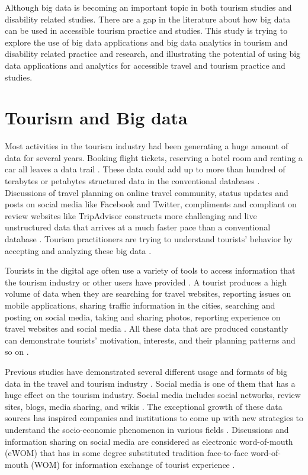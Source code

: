 Although big data is becoming an important topic in both tourism studies and disability
related studies. There are a gap in the literature about how big data can be used in 
accessible tourism practice and studies. This study is trying to explore the use of 
big data applications and big data analytics in tourism and disability related practice 
and research, and illustrating the potential of using big data applications and analytics 
for accessible travel and tourism practice and studies.

\section{Tourism and Big data}
Most activities in the tourism industry had been generating a huge amount of data for
several years. Booking flight tickets, reserving a hotel room and renting a car all
leaves a data trail \cite{Shafiee16}. These data could add up to more than hundred of
terabytes or petabytes structured data in the conventional databases \cite{akerkar2012}.
Discussions of travel planning on online travel community, status updates and posts on
social media like Facebook and Twitter, compliments and compliant on review websites like TripAdvisor
constructs more challenging and live unstructured data that arrives at a much
faster pace than a conventional database \cite{akerkar2012}. Tourism practitioners are
trying to understand tourists' behavior by accepting and analyzing these big data 
\cite{Shafiee16}.

Tourists in the digital age often use a variety of tools to access information that
the tourism industry or other users have provided \cite{XIANG2015120}. A tourist
produces a high volume of data when they are searching for travel websites, reporting
issues on mobile applications, sharing traffic information in the cities, searching and
posting on social media, taking and sharing photos, reporting experience on travel
websites and social media \cite{akerkar2012, Shafiee16}. All these data that are
produced constantly can demonstrate tourists' motivation, interests, and their
planning patterns and so on \cite{XIE2017101}.

Previous studies have demonstrated several different usage and formats of big data in
the travel and tourism industry \cite{XIE2017101}. Social media is one of them that
has a huge effect on the tourism industry. Social media includes social networks,
review sites, blogs, media sharing, and wikis \cite{XIANG2015120}. The exceptional
growth of these data sources has inspired companies and institutions to come up with 
new strategies to understand the socio-economic phenomenon in various
fields \cite{Shafiee16}. Discussions and information sharing on social media are
considered as electronic word-of-mouth (eWOM) that has in some degree substituted
tradition face-to-face word-of-mouth (WOM) for information exchange of tourist
experience \cite{chung2009}. 

